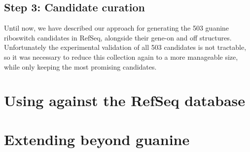 
\subsection{Step 3: Candidate curation}
\label{subsec:rfinder:curation}

Until now, we have described our approach for generating the 503 guanine riboswitch candidates in RefSeq, alongside their gene-on and off structures. Unfortunately the experimental validation of all 503 candidates is not tractable, so it was necessary to reduce this collection again to a more manageable size, while only keeping the most promising candidates.

\section{Using \rfinder against the RefSeq database}
\label{sec:rfinder:refseq}

\section{Extending beyond guanine \rbs}
\label{sec:rfinder:ext}
